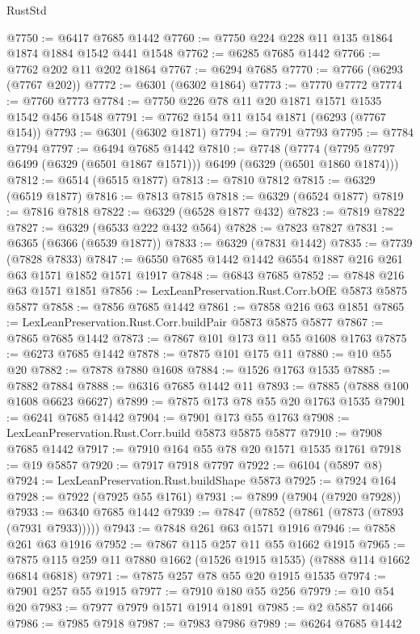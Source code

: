 \begin{lexlean}{RustStd}
\begin{coremodule}
{\begin{coremodule}
{{{{{{{{{{{{{{{{{{{{{{{{{{{{{{{{{{{@7750 := @6417 @7685 @1442
@7760 := @7750 @224 @228 @11 @135 @1864 @1874 @1884 @1542 @441 @1548
@7762 := @6285 @7685 @1442
@7766 := @7762 @202 @11 @202 @1864
@7767 := @6294 @7685
@7770 := @7766 (@6293 (@7767 @202))
@7772 := @6301 (@6302 @1864)
@7773 := @7770 @7772
@7774 := @7760 @7773
@7784 := @7750 @226 @78 @11 @20 @1871 @1571 @1535 @1542 @456 @1548
@7791 := @7762 @154 @11 @154 @1871 (@6293 (@7767 @154))
@7793 := @6301 (@6302 @1871)
@7794 := @7791 @7793
@7795 := @7784 @7794
@7797 := @6494 @7685 @1442
@7810 := @7748
    (@7774 (@7795 @7797 @6499 (@6329 (@6501 @1867 @1571))) @6499 (@6329 (@6501 @1860 @1874)))
@7812 := @6514 (@6515 @1877)
@7813 := @7810 @7812
@7815 := @6329 (@6519 @1877)
@7816 := @7813 @7815
@7818 := @6329 (@6524 @1877)
@7819 := @7816 @7818
@7822 := @6329 (@6528 @1877 @432)
@7823 := @7819 @7822
@7827 := @6329 (@6533 @222 @432 @564)
@7828 := @7823 @7827
@7831 := @6365 (@6366 (@6539 @1877))
@7833 := @6329 (@7831 @1442)
@7835 := @7739 (@7828 @7833)
@7847 := @6550 @7685 @1442 @1442 @6554 @1887 @216 @261 @63 @1571 @1852 @1571 @1917
@7848 := @6843 @7685
@7852 := @7848 @216 @63 @1571 @1851
@7856 := LexLeanPreservation.Rust.Corr.bOfE @5873 @5875 @5877
@7858 := @7856 @7685 @1442
@7861 := @7858 @216 @63 @1851
@7865 := LexLeanPreservation.Rust.Corr.buildPair @5873 @5875 @5877
@7867 := @7865 @7685 @1442
@7873 := @7867 @101 @173 @11 @55 @1608 @1763
@7875 := @6273 @7685 @1442
@7878 := @7875 @101 @175 @11
@7880 := @10 @55 @20
@7882 := @7878 @7880 @1608
@7884 := @1526 @1763 @1535
@7885 := @7882 @7884
@7888 := @6316 @7685 @1442 @11
@7893 := @7885 (@7888 @100 @1608 @6623 @6627)
@7899 := @7875 @173 @78 @55 @20 @1763 @1535
@7901 := @6241 @7685 @1442
@7904 := @7901 @173 @55 @1763
@7908 := LexLeanPreservation.Rust.Corr.build @5873 @5875 @5877
@7910 := @7908 @7685 @1442
@7917 := @7910 @164 @55 @78 @20 @1571 @1535 @1761
@7918 := @19 @5857
@7920 := @7917 @7918 @7797
@7922 := @6104 (@5897 @8)
@7924 := LexLeanPreservation.Rust.buildShape @5873
@7925 := @7924 @164
@7928 := @7922 (@7925 @55 @1761)
@7931 := @7899 (@7904 (@7920 @7928))
@7933 := @6340 @7685 @1442
@7939 := @7847 (@7852 (@7861 (@7873 (@7893 (@7931 @7933)))))
@7943 := @7848 @261 @63 @1571 @1916
@7946 := @7858 @261 @63 @1916
@7952 := @7867 @115 @257 @11 @55 @1662 @1915
@7965 := @7875 @115 @259 @11 @7880 @1662 (@1526 @1915 @1535) (@7888 @114 @1662 @6814 @6818)
@7971 := @7875 @257 @78 @55 @20 @1915 @1535
@7974 := @7901 @257 @55 @1915
@7977 := @7910 @180 @55 @256
@7979 := @10 @54 @20
@7983 := @7977 @7979 @1571 @1914 @1891
@7985 := @2 @5857 @1466
@7986 := @7985 @7918
@7987 := @7983 @7986
@7989 := @6264 @7685 @1442
}}}}}}}}}}}}}}}}}}}}}}}}}}}}}}}}}}}
\end{coremodule}}
\end{coremodule}
\end{lexlean}
